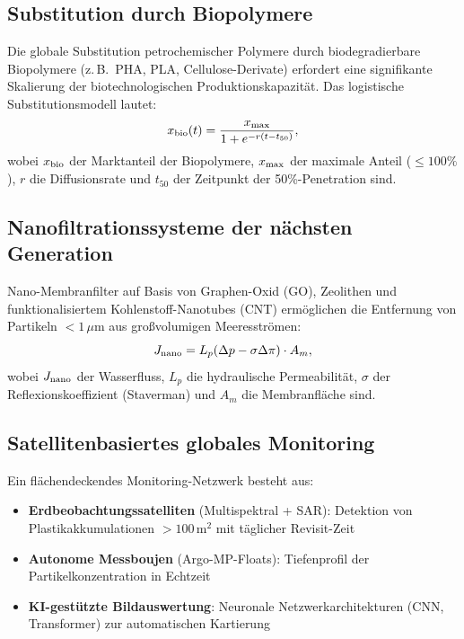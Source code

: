 ﻿\documentclass[12pt,a4paper]{article}
\theoremstyle{definition}
\theoremstyle{remark}
\newcommand{\eg}{z.\,B.\,}
\begin{document}
\subsection{Substitution durch Biopolymere}

Die globale Substitution petrochemischer Polymere durch biodegradierbare
Biopolymere (\eg{} PHA, PLA, Cellulose-Derivate) erfordert eine signifikante
Skalierung der biotechnologischen Produktionskapazit\"at. Das logistische
Substitutionsmodell lautet:
\begin{equation}
  x_{\rm bio}(t) = \frac{x_{\rm max}}{1 + e^{-r(t - t_{50})}},
  \label{eq:logistic_sub}
\end{equation}
wobei $x_{\rm bio}$ der Marktanteil der Biopolymere, $x_{\rm max}$ der maximale
Anteil ($\leq 100\%$), $r$ die Diffusionsrate und $t_{50}$ der Zeitpunkt der
50\%-Penetration sind.

\subsection{Nanofiltrationssysteme der n\"achsten Generation}

Nano-Membranfilter auf Basis von Graphen-Oxid (GO), Zeolithen und
funktionalisiertem Kohlenstoff-Nanotubes (CNT) erm\"oglichen die Entfernung
von Partikeln $< 1\,\mu\text{m}$ aus gro\ss{}volumigen Meeresstr\"omen:
\begin{equation}
  J_{\rm nano} = L_p (\Delta p - \sigma \Delta\pi) \cdot A_m,
  \label{eq:nanofil}
\end{equation}
wobei $J_{\rm nano}$ der Wasserfluss, $L_p$ die hydraulische Permeabilit\"at,
$\sigma$ der Reflexionskoeffizient (Staverman) und $A_m$ die Membranfl\"ache
sind.

\subsection{Satellitenbasiertes globales Monitoring}

Ein fl\"achendeckendes Monitoring-Netzwerk besteht aus:
\begin{itemize}
  \item \textbf{Erdbeobachtungssatelliten} (Multispektral + SAR): Detektion
        von Plastikakkumulationen $> 100\,\text{m}^2$ mit t\"aglicher Revisit-Zeit
  \item \textbf{Autonome Messboujen} (Argo-MP-Floats): Tiefenprofil der
        Partikelkonzentration in Echtzeit
  \item \textbf{KI-gest\"utzte Bildauswertung}: Neuronale Netzwerkarchitekturen
        (CNN, Transformer) zur automatischen Kartierung
\end{itemize}
\end{document}

